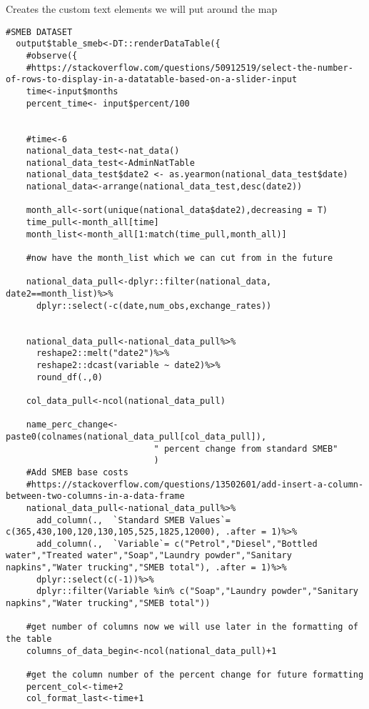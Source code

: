 \documentclass[
]{article}
\begin{document}
Creates the custom text elements we will put around the map

\begin{verbatim}
#SMEB DATASET  
  output$table_smeb<-DT::renderDataTable({
    #observe({
    #https://stackoverflow.com/questions/50912519/select-the-number-of-rows-to-display-in-a-datatable-based-on-a-slider-input
    time<-input$months
    percent_time<- input$percent/100
    
    
    #time<-6
    national_data_test<-nat_data()
    national_data_test<-AdminNatTable
    national_data_test$date2 <- as.yearmon(national_data_test$date)
    national_data<-arrange(national_data_test,desc(date2))
    
    month_all<-sort(unique(national_data$date2),decreasing = T)
    time_pull<-month_all[time]
    month_list<-month_all[1:match(time_pull,month_all)]
    
    #now have the month_list which we can cut from in the future
    
    national_data_pull<-dplyr::filter(national_data, date2==month_list)%>%
      dplyr::select(-c(date,num_obs,exchange_rates))
    
    
    national_data_pull<-national_data_pull%>%
      reshape2::melt("date2")%>%
      reshape2::dcast(variable ~ date2)%>%
      round_df(.,0)
    
    col_data_pull<-ncol(national_data_pull)
    
    name_perc_change<-paste0(colnames(national_data_pull[col_data_pull]),
                             " percent change from standard SMEB"
                             )
    #Add SMEB base costs
    #https://stackoverflow.com/questions/13502601/add-insert-a-column-between-two-columns-in-a-data-frame
    national_data_pull<-national_data_pull%>%
      add_column(.,  `Standard SMEB Values`= c(365,430,100,120,130,105,525,1825,12000), .after = 1)%>%
      add_column(.,  `Variable`= c("Petrol","Diesel","Bottled water","Treated water","Soap","Laundry powder","Sanitary napkins","Water trucking","SMEB total"), .after = 1)%>%
      dplyr::select(c(-1))%>%
      dplyr::filter(Variable %in% c("Soap","Laundry powder","Sanitary napkins","Water trucking","SMEB total"))
    
    #get number of columns now we will use later in the formatting of the table
    columns_of_data_begin<-ncol(national_data_pull)+1
    
    #get the column number of the percent change for future formatting
    percent_col<-time+2
    col_format_last<-time+1
    

\end{verbatim}
\end{document}
